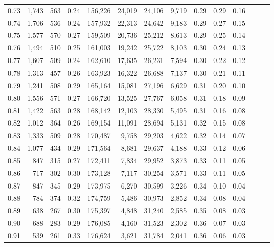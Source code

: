 \begin{tabular}{rrrrrrrrrrrrrr}
0.73 &  1,743 &  563 &  0.24 &  156,226 &   24,019 &  24,106 &   9,719 &  0.29 &  0.29 &      0.16 \\
0.74 &  1,706 &  536 &  0.24 &  157,932 &   22,313 &  24,642 &   9,183 &  0.29 &  0.27 &      0.15 \\
0.75 &  1,577 &  570 &  0.27 &  159,509 &   20,736 &  25,212 &   8,613 &  0.29 &  0.25 &      0.14 \\
0.76 &  1,494 &  510 &  0.25 &  161,003 &   19,242 &  25,722 &   8,103 &  0.30 &  0.24 &      0.13 \\
0.77 &  1,607 &  509 &  0.24 &  162,610 &   17,635 &  26,231 &   7,594 &  0.30 &  0.22 &      0.12 \\
0.78 &  1,313 &  457 &  0.26 &  163,923 &   16,322 &  26,688 &   7,137 &  0.30 &  0.21 &      0.11 \\
0.79 &  1,241 &  508 &  0.29 &  165,164 &   15,081 &  27,196 &   6,629 &  0.31 &  0.20 &      0.10 \\
0.80 &  1,556 &  571 &  0.27 &  166,720 &   13,525 &  27,767 &   6,058 &  0.31 &  0.18 &      0.09 \\
0.81 &  1,422 &  563 &  0.28 &  168,142 &   12,103 &  28,330 &   5,495 &  0.31 &  0.16 &      0.08 \\
0.82 &  1,012 &  364 &  0.26 &  169,154 &   11,091 &  28,694 &   5,131 &  0.32 &  0.15 &      0.08 \\
0.83 &  1,333 &  509 &  0.28 &  170,487 &    9,758 &  29,203 &   4,622 &  0.32 &  0.14 &      0.07 \\
0.84 &  1,077 &  434 &  0.29 &  171,564 &    8,681 &  29,637 &   4,188 &  0.33 &  0.12 &      0.06 \\
0.85 &    847 &  315 &  0.27 &  172,411 &    7,834 &  29,952 &   3,873 &  0.33 &  0.11 &      0.05 \\
0.86 &    717 &  302 &  0.30 &  173,128 &    7,117 &  30,254 &   3,571 &  0.33 &  0.11 &      0.05 \\
0.87 &    847 &  345 &  0.29 &  173,975 &    6,270 &  30,599 &   3,226 &  0.34 &  0.10 &      0.04 \\
0.88 &    784 &  374 &  0.32 &  174,759 &    5,486 &  30,973 &   2,852 &  0.34 &  0.08 &      0.04 \\
0.89 &    638 &  267 &  0.30 &  175,397 &    4,848 &  31,240 &   2,585 &  0.35 &  0.08 &      0.03 \\
0.90 &    688 &  283 &  0.29 &  176,085 &    4,160 &  31,523 &   2,302 &  0.36 &  0.07 &      0.03 \\
0.91 &    539 &  261 &  0.33 &  176,624 &    3,621 &  31,784 &   2,041 &  0.36 &  0.06 &      0.03 \\

\end{tabular}
